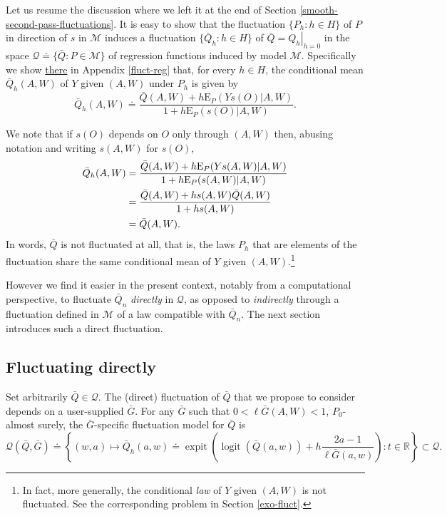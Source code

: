 \documentclass[11pt,openright,twoside]{book}
\DeclareMathOperator{\expit}{expit}
\DeclareMathOperator{\logit}{logit}
\newcommand{\bbR}{\mathbb{R}}
\newcommand{\defq}{\doteq}
\newcommand{\calM}{\mathcal{M}}
\newcommand{\calQ}{\mathcal{Q}}
\newcommand{\Exp}{\textrm{E}}
\newcommand{\Gbar}{\bar{G}}
\newcommand{\Qbar}{\bar{Q}}
\theoremstyle{definition}
\theoremstyle{definition}
\theoremstyle{definition}
\theoremstyle{remark}
\begin{document}
Let us resume the discussion where we left it at the end of Section
\ref{smooth-second-pass-fluctuations}. It is easy to show that the
fluctuation \(\{P_{h} : h \in H\}\) of \(P\) in direction of \(s\) in \(\calM\)
induces a fluctuation \(\{\Qbar_{h} : h \in H\}\) of \(\Qbar = \left.Q_{h}\right|_{h=0}\) in the space \(\calQ \defq \{\Qbar : P \in \calM\}\) of regression functions induced by model \(\calM\). Specifically we
show \protect\hyperlink{fluct-reg}{there} in Appendix \ref{fluct-reg} that, for every \(h \in H\), the conditional mean \(\Qbar_{h}(A,W)\) of \(Y\) given \((A,W)\) under \(P_{h}\)
is given by \begin{equation*}\Qbar_{h}(A,W)  \defq \frac{\Qbar(A,W)  + h
\Exp_{P}(Ys(O) | A,W)}{1 + h \Exp_{P}(s(O)|A,W)}.\end{equation*}

We note that if \(s(O)\) depends on \(O\) only through \((A,W)\) then, abusing
notation and writing \(s(A,W)\) for \(s(O)\),
\begin{align}
\Qbar_{h}(A,W)  &=  \frac{\Qbar(A,W)  +  h  \Exp_{P}(Ys(A,W)  |  A,W)}{1  +  h
\Exp_{P}(s(A,W)|A,W)}\notag\\&=\frac{\Qbar(A,W)  + h  s(A,W)\Qbar(A,W)}{1 +  h
s(A,W)}\notag\\&=\Qbar(A,W).\label{eq:Qbarh}
\end{align}
In words, \(\Qbar\) is not fluctuated at all, that is, the laws \(P_{h}\) that are
elements of the fluctuation share the same conditional mean of \(Y\) given
\((A,W)\).\footnote{In fact, more generally, the conditional \emph{law} of \(Y\) given \((A,W)\)
  is not fluctuated. See the corresponding problem in Section \ref{exo-fluct}.}

However we find it easier in the present context, notably from a computational
perspective, to fluctuate \(\Qbar_{n}\) \emph{directly} in \(\calQ\), as opposed to
\emph{indirectly} through a fluctuation defined in \(\calM\) of a law compatible with
\(\Qbar_{n}\). The next section introduces such a direct fluctuation.

\hypertarget{fluct-direct}{%
\subsection{Fluctuating directly}\label{fluct-direct}}

Set arbitrarily \(\Qbar \in \calQ\). The (direct) fluctuation of \(\Qbar\) that we
propose to consider depends on a user-supplied \(\Gbar\). For any \(\Gbar\) such
that \(0 < \ell\Gbar(A,W) < 1\), \(P_{0}\)-almost surely, the \(\Gbar\)-specific
fluctuation model for \(\Qbar\) is
\begin{equation} 
\calQ(\Qbar,\Gbar)\defq      \left\{(w,a)       \mapsto      \Qbar_{h}(a,w)      \defq
\expit\left(\logit\left(\Qbar(a,w)\right) +  h \frac{2a -  1}{\ell \Gbar(a,w)}
\right) : t \in \bbR\right\} \subset \calQ. \label{eq:Q-fluct} 
\end{equation}
\end{document}
